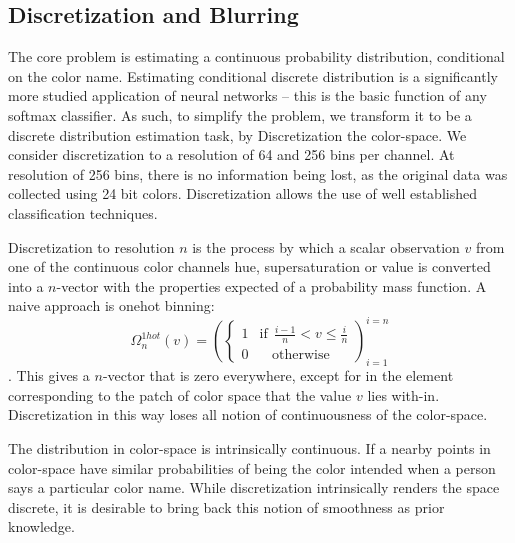 \documentclass[11pt,letterpaper]{article}
\begin{document}
\subsection{Discretization and Blurring}
The core problem is estimating a continuous  probability distribution, conditional on the color name.
Estimating conditional discrete distribution is a significantly more studied application of neural networks
-- this is the basic function of any softmax classifier.
As such, to simplify the problem, we transform it to be a discrete distribution estimation task, by Discretization the color-space.
We consider discretization to a resolution of 64 and 256 bins per channel.
At resolution of 256 bins, there is no information being lost, as the original data was collected using 24 bit colors.
Discretization allows the use of well established classification techniques.

Discretization to resolution $n$ is the process by which a scalar observation $v$ from one of the continuous color channels hue, supersaturation or value is converted into a $n$-vector with the properties expected of a probability mass function.
A naive approach is onehot binning:
\[\Omega_{n}^{1hot}(v)=\left(\begin{cases}
1 & \mathrm{if}\:\:\frac{i-1}{n}<v\le\frac{i}{n}\\
0 & \:\:\:\:\mathrm{otherwise}
\end{cases}\right)_{i=1}^{i=n}
\].
This gives a $n$-vector that is zero everywhere, except for in the element corresponding to the patch of color space that the value $v$ lies with-in.
Discretization in this way loses all notion of continuousness of the color-space.

The distribution in color-space is intrinsically continuous.
If a nearby points in color-space have similar probabilities of being the color intended when a person says a particular color name.
While discretization intrinsically renders the space discrete, it is desirable to bring back this notion of smoothness as prior knowledge.
\end{document}

